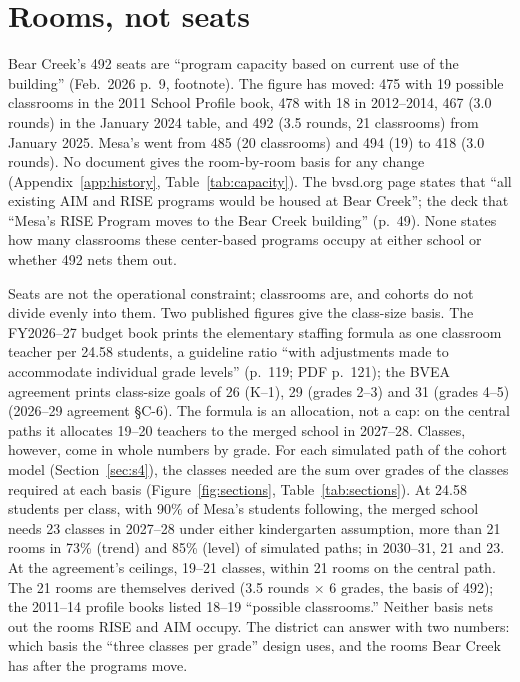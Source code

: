 \documentclass[11pt]{article}
\begin{document}
\section{Rooms, not seats}\label{sec:s3}
Bear Creek's 492 seats are ``program capacity based on current use of the building'' (Feb.\ 2026 p.\ 9, footnote). The figure has moved: 475 with 19 possible classrooms in the 2011 School Profile book, 478 with 18 in 2012--2014, 467 (3.0 rounds) in the January 2024 table, and 492 (3.5 rounds, 21 classrooms) from January 2025. Mesa's went from 485 (20 classrooms) and 494 (19) to 418 (3.0 rounds). No document gives the room-by-room basis for any change (Appendix~\ref{app:history}, Table~\ref{tab:capacity}). The bvsd.org page states that ``all existing AIM and RISE programs would be housed at Bear Creek''; the deck that ``Mesa's RISE Program moves to the Bear Creek building'' (p.\ 49). None states how many classrooms these center-based programs occupy at either school or whether 492 nets them out.

Seats are not the operational constraint; classrooms are, and cohorts do not divide evenly into them. Two published figures give the class-size basis. The FY2026--27 budget book prints the elementary staffing formula as one classroom teacher per 24.58 students, a guideline ratio ``with adjustments made to accommodate individual grade levels'' (p.\ 119; PDF p.\ 121); the BVEA agreement prints class-size goals of 26 (K--1), 29 (grades 2--3) and 31 (grades 4--5) (2026--29 agreement \S C-6). The formula is an allocation, not a cap: on the central paths it allocates 19--20 teachers to the merged school in 2027--28. Classes, however, come in whole numbers by grade. For each simulated path of the cohort model (Section~\ref{sec:s4}), the classes needed are the sum over grades of the classes required at each basis (Figure~\ref{fig:sections}, Table~\ref{tab:sections}). At 24.58 students per class, with 90\% of Mesa's students following, the merged school needs 23 classes in 2027--28 under either kindergarten assumption, more than 21 rooms in 73\% (trend) and 85\% (level) of simulated paths; in 2030--31, 21 and 23. At the agreement's ceilings, 19--21 classes, within 21 rooms on the central path. The 21 rooms are themselves derived (3.5 rounds $\times$ 6 grades, the basis of 492); the 2011--14 profile books listed 18--19 ``possible classrooms.'' Neither basis nets out the rooms RISE and AIM occupy. The district can answer with two numbers: which basis the ``three classes per grade'' design uses, and the rooms Bear Creek has after the programs move.
\end{document}
